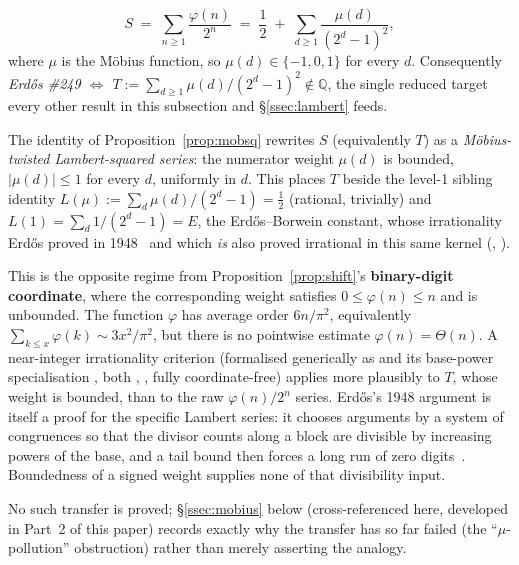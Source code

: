 \begin{prop}
\label{prop:mobsq}
\[
S \;=\; \sum_{n\ge1}\frac{\varphi(n)}{2^n} \;=\; \frac12 \;+\; \sum_{d\ge1}\frac{\mu(d)}{(2^d-1)^2},
\]
where $\mu$ is the M\"obius function, so $\mu(d)\in\{-1,0,1\}$ for every $d$.
Consequently \emph{Erd\H{o}s \#249 $\iff$ $T:=\sum_{d\ge1}\mu(d)/(2^d-1)^2 \notin \mathbb{Q}$},
the single reduced target every other result in this subsection and
\S\ref{ssec:lambert} feeds.
  
\end{prop}

\begin{rem}
The identity of Proposition~\ref{prop:mobsq} rewrites $S$ (equivalently $T$)
as a \emph{M\"obius-twisted Lambert-squared series}: the numerator weight
$\mu(d)$ is bounded, $|\mu(d)|\le1$ for every $d$, uniformly in $d$. This
places $T$ beside the level-1 sibling identity
$L(\mu):=\sum_d \mu(d)/(2^d-1) = \tfrac12$ (rational, trivially) and
$L(1) = \sum_d 1/(2^d-1) = E$, the Erd\H{o}s--Borwein constant, whose
irrationality Erd\H{o}s proved in 1948~\cite{erdos1948lambert} and which
\emph{is} also proved irrational in this same kernel
(, ).

\par\medskip

This is the opposite regime from Proposition~\ref{prop:shift}'s
\textbf{binary-digit coordinate}, where the corresponding weight satisfies
$0\le\varphi(n)\le n$ and is unbounded.  The function $\varphi$ has average
order $6n/\pi^2$, equivalently
$\sum_{k\le x}\varphi(k)\sim 3x^2/\pi^2$, but there is no pointwise estimate
$\varphi(n)=\Theta(n)$. A near-integer irrationality criterion
(formalised generically as
 and its
base-power specialisation
, both
, , fully coordinate-free) applies more plausibly to $T$,
whose weight is bounded, than to the raw $\varphi(n)/2^n$ series.
Erd\H{o}s's 1948 argument is itself a proof for the specific Lambert series:
it chooses arguments by a system of congruences so that the divisor counts
along a block are divisible by increasing powers of the base, and a tail bound
then forces a long run of zero digits~\cite[pp.~63--66]{erdos1948lambert}.
Boundedness of a signed weight supplies none of that divisibility input.

\par\medskip

No such transfer is proved; \S\ref{ssec:mobius} below (cross-referenced
here, developed in Part~2 of this paper) records exactly why the transfer has
so far failed (the ``$\mu$-pollution'' obstruction) rather than merely
asserting the analogy.
\end{rem}

